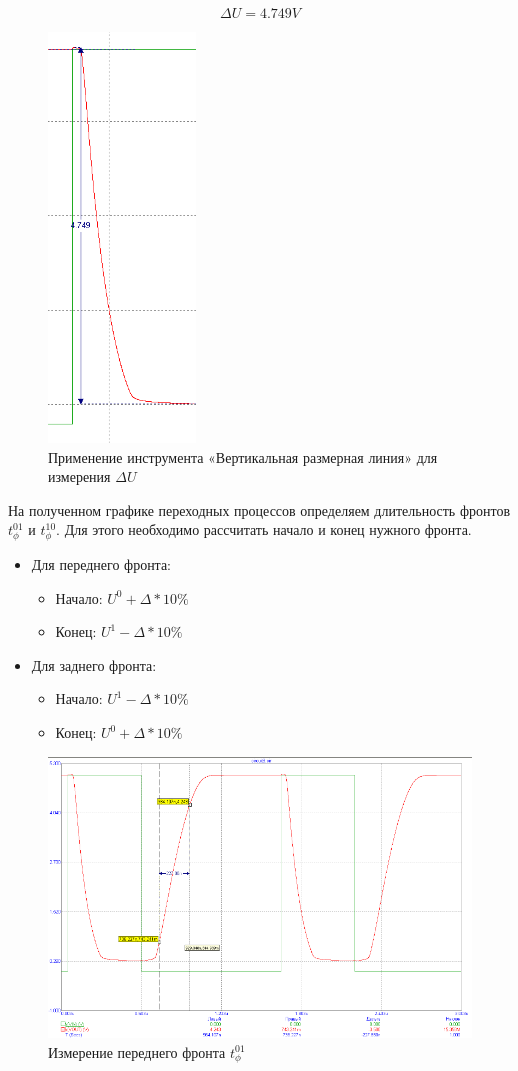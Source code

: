 \documentclass[a4paper,14pt]{article}
\begin{document}
$$\Delta U = 4.749 V$$

\begin{figure}[H]
	\centering
	\includegraphics[width=0.2\linewidth]{image/BT_graf_per1}
	\caption{Применение инструмента «Вертикальная размерная линия» для измерения $\Delta U$}
	\label{fig:btgrafper1}
\end{figure}

На полученном графике переходных процессов определяем длительность фронтов $t^{01}_\phi$ и $t^{10}_\phi$.
Для этого необходимо рассчитать начало и конец нужного фронта.

\begin{itemize}
	\item Для переднего фронта: 
	\begin{itemize}
		\item Начало: $U^0 + \Delta * 10\%$
		\item Конец:  $U^1 - \Delta * 10\%$
	\end{itemize}
	
	\item Для заднего фронта: 
	\begin{itemize}
		\item Начало: $U^1 - \Delta * 10\%$
		\item Конец:  $U^0 + \Delta * 10\%$
	\end{itemize}
\end{itemize}

\begin{figure}[H]
	\centering
	\includegraphics[width=0.7\linewidth]{image/BT_graf_t01}
	\caption{Измерение переднего фронта $t^{01}_\phi$}
	\label{fig:btgraft01}
\end{figure}
\end{document}
